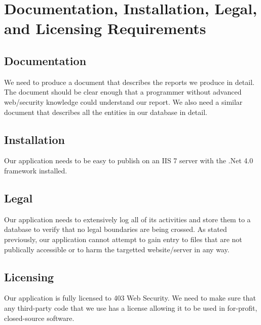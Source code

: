 \section{Documentation, Installation, Legal, and Licensing Requirements}
\subsection{Documentation}
We need to produce a document that describes the reports we produce in detail. The document should be clear enough that a programmer without advanced web/security knowledge could understand our report. We also need a similar document that describes all the entities in our database in detail. 
\subsection{Installation}
Our application needs to be easy to publish on an IIS 7 server with the .Net 4.0 framework installed.
\subsection{Legal}
Our application needs to extensively log all of its activities and store them to a database to verify that no legal boundaries are being crossed. As stated previously, our application cannot attempt to gain entry to files that are not publically accessible or to harm the targetted website/server in any way.
\subsection{Licensing}
Our application is fully licensed to 403 Web Security. We need to make sure that any third-party code that we use has a license allowing it to be used in for-profit, closed-source software.